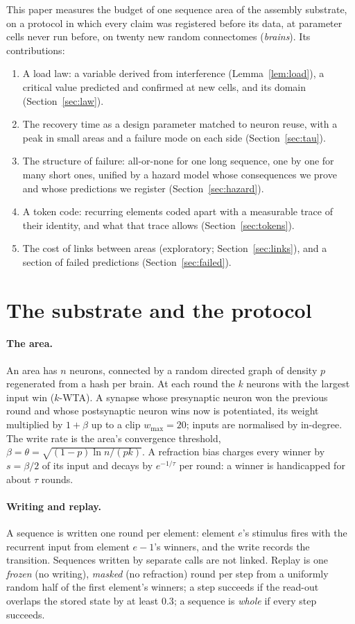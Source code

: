 \documentclass[11pt]{article}
\theoremstyle{definition}
\theoremstyle{plain}
\begin{document}
This paper measures the budget of one sequence area of the assembly substrate,
on a protocol in which every claim was registered before its data, at
parameter cells never run before, on twenty new random connectomes
(\emph{brains}). Its contributions:
\begin{enumerate}
\item A load law: a variable derived from interference
  (Lemma~\ref{lem:load}), a critical value predicted and confirmed at new cells,
  and its domain (Section~\ref{sec:law}).
\item The recovery time as a design parameter matched to neuron reuse, with a
  peak in small areas and a failure mode on each side (Section~\ref{sec:tau}).
\item The structure of failure: all-or-none for one long sequence, one by one
  for many short ones, unified by a hazard model whose consequences we prove
  and whose predictions we register (Section~\ref{sec:hazard}).
\item A token code: recurring elements coded apart with a measurable trace of
  their identity, and what that trace allows (Section~\ref{sec:tokens}).
\item The cost of links between areas (exploratory; Section~\ref{sec:links}),
  and a section of failed predictions (Section~\ref{sec:failed}).
\end{enumerate}

\section{The substrate and the protocol}\label{sec:methods}

\paragraph{The area.} An area has $n$ neurons, connected by a random directed
graph of density $p$ regenerated from a hash per brain. At each round the $k$
neurons with the largest input win ($k$-WTA). A synapse whose presynaptic neuron
won the previous round and whose postsynaptic neuron wins now is potentiated,
its weight multiplied by $1+\beta$ up to a clip $w_{\max} = 20$; inputs are
normalised by in-degree. The write rate is the area's convergence threshold,
$\beta = \theta = \sqrt{(1-p)\ln n/(pk)}$. A refraction bias charges every winner
by $s = \beta/2$ of its input and decays by $e^{-1/\tau}$ per round: a winner is
handicapped for about $\tau$ rounds.

\paragraph{Writing and replay.} A sequence is written one round per element:
element $e$'s stimulus fires with the recurrent input from element $e-1$'s
winners, and the write records the transition. Sequences written by separate
calls are not linked. Replay is one \emph{frozen} (no writing), \emph{masked}
(no refraction) round per step from a uniformly random half of the first
element's winners; a step succeeds if the read-out overlaps the stored state by
at least $0.3$; a sequence is \emph{whole} if every step succeeds.
\end{document}
